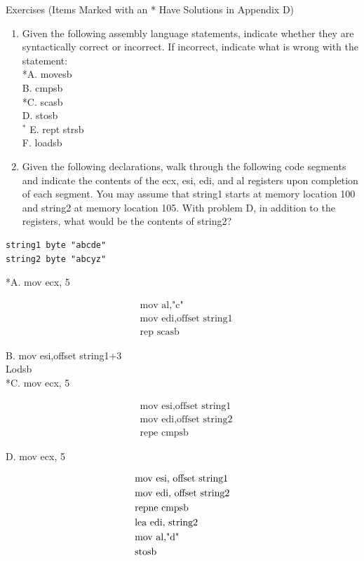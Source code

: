 \documentclass[10pt]{book}
\begin{document}
Exercises (Items Marked with an * Have Solutions in Appendix D)
\begin{enumerate}
  \item Given the following assembly language statements, indicate whether they are syntactically correct or incorrect. If incorrect, indicate what is wrong with the statement:\\
*A. movesb\\
B. cmpsb\\
*C. scasb\\
D. stosb\\
${ }^{*}$ E. rept strsb\\
F. loadsb
  \item Given the following declarations, walk through the following code segments and indicate the contents of the ecx, esi, edi, and al registers upon completion of each segment. You may assume that string1 starts at memory location 100 and string2 at memory location 105. With problem D, in addition to the registers, what would be the contents of string2?
\end{enumerate}


\begin{verbatim}
string1 byte "abcde"
string2 byte "abcyz"
\end{verbatim}

*A. mov ecx, 5

$$
\begin{aligned}
& \text { mov al,"c" } \\
& \text { mov edi,offset string1 } \\
& \text { rep scasb }
\end{aligned}
$$

B. mov esi,offset string1+3\\
Lodsb\\
*C. mov ecx, 5

$$
\begin{aligned}
& \text { mov esi,offset string1 } \\
& \text { mov edi,offset string2 } \\
& \text { repe cmpsb }
\end{aligned}
$$

D. mov ecx, 5

$$
\begin{aligned}
& \text { mov esi, offset string1 } \\\index{ﬁld}\index{ﬁstp}
& \text { mov edi, offset string2 } \\
& \text { repne cmpsb } \\
& \text { lea edi, string2 } \\
& \text { mov al,"d" } \\
& \text { stosb }
\end{aligned}
$$
\end{document}
